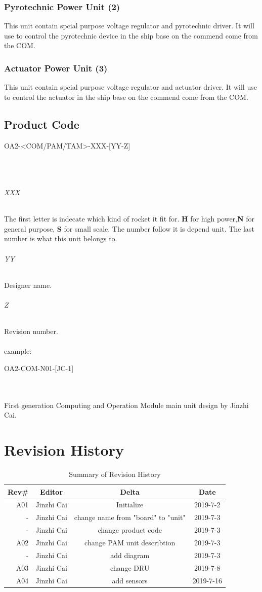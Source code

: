 \documentclass[12pt,article]{memoir}
\begin{document}
\subsection{Pyrotechnic Power Unit (2)}
This unit contain spcial purpose voltage regulator and pyrotechnic driver. It will use to control the pyrotechnic device in the ship base on the commend come from the COM. 
\subsection{Actuator Power Unit (3)}
This unit contain spcial purpose voltage regulator and actuator driver. It will use to control the actuator in the ship base on the commend come from the COM.
\section{Product Code}
\begin{LARGE}
OA2-<COM/PAM/TAM>-XXX-[YY-Z]
\end{LARGE}\\\\
\subparagraph{XXX}
The first letter is indecate which kind of rocket it fit for. \textbf{H} for high power,\textbf{N} for general purpose, \textbf{S} for small scale. The number follow it is depend unit. The last number is what this unit belongs to. 
\subparagraph{YY}
Designer name.
\subparagraph{Z}
Revision number.\\\\
example: 
\begin{large}
OA2-COM-N01-[JC-1]
\end{large}\\\\
First generation Computing and Operation Module main unit design by Jinzhi Cai.
\newpage
\chapter{Revision History}%
\begin{table}[H]
	\centering
	\begin{tabu}{r || c | c | c }
		Rev\# & Editor & Delta & Date\\ \hline
		A01 & Jinzhi Cai & Initialize  & 2019-7-2\\
		- & Jinzhi Cai & change name from "board" to "unit" & 2019-7-3\\
		- & Jinzhi Cai & change product code & 2019-7-3\\ \hline
		A02 & Jinzhi Cai & change PAM unit describtion & 2019-7-3\\
		- & Jinzhi Cai & add diagram & 2019-7-3\\ \hline
		A03 & Jinzhi Cai & change DRU & 2019-7-8\\ \hline
		A04 & Jinzhi Cai & add sensors & 2019-7-16\\ \hline
	\end{tabu}
	\caption{Summary of Revision History}
	\label{tab:edatools}
\end{table}
\end{document}
